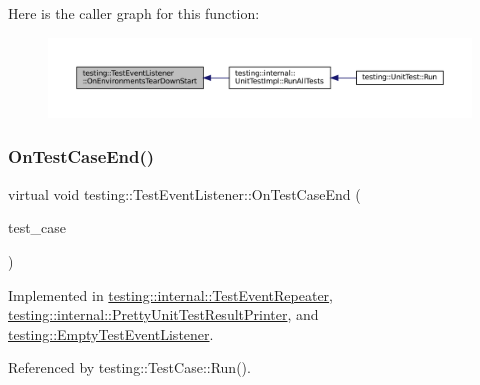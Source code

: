 Here is the caller graph for this function\+:
\nopagebreak
\begin{figure}[H]
\begin{center}
\leavevmode
\includegraphics[width=350pt]{classtesting_1_1TestEventListener_a468b5e6701bcb86cb2c956caadbba5e4_icgraph}
\end{center}
\end{figure}
\mbox{\label{classtesting_1_1TestEventListener_ae61985e2ef76ac78379b077be57a9c36}} 
\subsubsection{\texorpdfstring{On\+Test\+Case\+End()}{OnTestCaseEnd()}}
{\footnotesize\ttfamily virtual void testing\+::\+Test\+Event\+Listener\+::\+On\+Test\+Case\+End (\begin{DoxyParamCaption}\item[{const \hyperlink{classtesting_1_1TestCase}{Test\+Case} \&}]{test\+\_\+case }\end{DoxyParamCaption})\hspace{0.3cm}{\ttfamily [pure virtual]}}



Implemented in \hyperlink{classtesting_1_1internal_1_1TestEventRepeater_a0a335e1c3957a8c699ed56e37ea7b978}{testing\+::internal\+::\+Test\+Event\+Repeater}, \hyperlink{classtesting_1_1internal_1_1PrettyUnitTestResultPrinter_a7a62fe58fa6f6aace813eb62b31e5a51}{testing\+::internal\+::\+Pretty\+Unit\+Test\+Result\+Printer}, and \hyperlink{classtesting_1_1EmptyTestEventListener_a6bec703158283104c4298f7d8a528515}{testing\+::\+Empty\+Test\+Event\+Listener}.



Referenced by testing\+::\+Test\+Case\+::\+Run().

